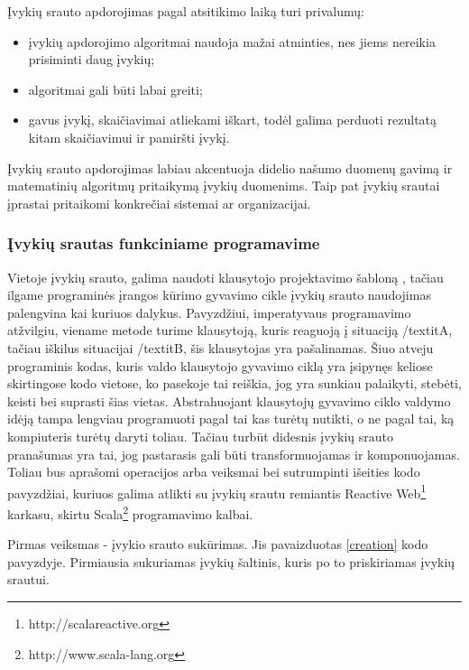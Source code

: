 Įvykių srauto apdorojimas pagal atsitikimo laiką turi privalumų:

\begin{itemize}

	\item įvykių apdorojimo algoritmai naudoja mažai atminties, nes jiems nereikia prisiminti daug įvykių;

	\item algoritmai gali būti labai greiti;

	\item gavus įvykį, skaičiavimai atliekami iškart, todėl galima perduoti rezultatą kitam skaičiavimui ir pamiršti įvykį.

\end{itemize}

Įvykių srauto apdorojimas labiau akcentuoja didelio našumo duomenų gavimą ir matematinių algoritmų pritaikymą įvykių duomenims. Taip pat įvykių srautai įprastai pritaikomi konkrečiai sistemai ar organizacijai.

\subsubsection{Įvykių srautas funkciniame programavime}

Vietoje įvykių srauto, galima naudoti klausytojo projektavimo šabloną \cite{WhiteboardPattern}, tačiau ilgame programinės įrangos kūrimo gyvavimo cikle įvykių srauto naudojimas palengvina kai kuriuos dalykus. Pavyzdžiui, imperatyvaus programavimo atžvilgiu, viename metode turime klausytoją, kuris reaguoją į situaciją /textit{A}, tačiau iškilus situacijai /textit{B}, šis klausytojas yra pašalinamas. Šiuo atveju programinis kodas, kuris valdo klausytojo gyvavimo ciklą yra įsipynęs keliose skirtingose kodo vietose, ko pasekoje tai reiškia, jog yra sunkiau palaikyti, stebėti, keisti bei suprasti šias vietas. Abstrahuojant klausytojų gyvavimo ciklo valdymo idėją tampa lengviau programuoti pagal tai kas turėtų nutikti, o ne pagal tai, ką kompiuteris turėtų daryti toliau. Tačiau turbūt didesnis įvykių srauto pranašumas yra tai, jog pastarasis gali būti transformuojamas ir komponuojamas. Toliau bus aprašomi operacijos arba veiksmai bei sutrumpinti išeities kodo pavyzdžiai, kuriuos galima atlikti su įvykių srautu remiantis Reactive Web\footnote{http://scalareactive.org} karkasu, skirtu Scala\footnote{http://www.scala-lang.org} programavimo kalbai.

Pirmas veiksmas - įvykio srauto sukūrimas. Jis pavaizduotas \ref{creation} kodo pavyzdyje.  Pirmiausia sukuriamas įvykių šaltinis, kuris po to priskiriamas įvykių srautui.


